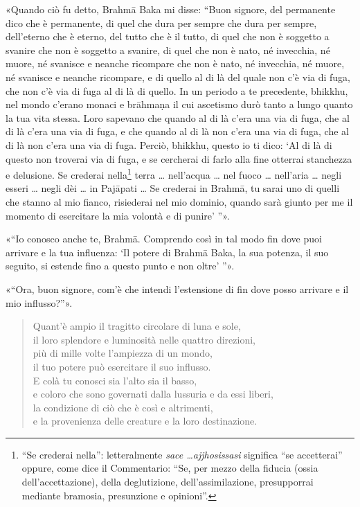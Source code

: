 «Quando ciò fu detto, Brahmā Baka mi disse: “Buon signore, del
permanente dico che è permanente, di quel che dura per sempre che dura
per sempre, dell’eterno che è eterno, del tutto che è il tutto, di quel
che non è soggetto a svanire che non è soggetto a svanire, di quel che
non è nato, né invecchia, né muore, né svanisce e neanche ricompare che
non è nato, né invecchia, né muore, né svanisce e neanche ricompare, e
di quello al di là del quale non c’è via di fuga, che non c’è via di
fuga al di là di quello. In un periodo a te precedente, bhikkhu, nel
mondo c’erano monaci e brāhmaṇa il cui ascetismo durò tanto a lungo
quanto la tua vita stessa. Loro sapevano che quando al di là c’era una
via di fuga, che al di là c’era una via di fuga, e che quando al di là
non c’era una via di fuga, che al di là non c’era una via di fuga.
Perciò, bhikkhu, questo io ti dico: ‘Al di là di questo non troverai via
di fuga, e se cercherai di farlo alla fine otterrai stanchezza e
delusione. Se crederai nella\footnote{“Se crederai nella”: letteralmente \emph{sace …​ ajjhosissasi} significa “se accetterai” oppure, come dice il Commentario: “Se, per mezzo della fiducia (ossia dell’accettazione), della deglutizione, dell’assimilazione, presupporrai mediante bramosia, presunzione e opinioni”.} terra … nell’acqua … nel
fuoco … nell’aria … negli esseri … negli dèi … in Pajāpati … Se crederai
in Brahmā, tu sarai uno di quelli che stanno al mio fianco, risiederai
nel mio dominio, quando sarà giunto per me il momento di esercitare la
mia volontà e di punire’ ”».


«“Io conosco anche te, Brahmā. Comprendo così in tal modo fin dove puoi
arrivare e la tua influenza: ‘Il potere di Brahmā Baka, la sua potenza,
il suo seguito, si estende fino a questo punto e non oltre’ ”».


«“Ora, buon signore, com’è che intendi l’estensione di fin dove posso
arrivare e il mio influsso?”».


\begin{quote}
Quant’è ampio il tragitto circolare di luna e sole, \\
il loro splendore e luminosità nelle quattro direzioni, \\
più di mille volte l’ampiezza di un mondo, \\
il tuo potere può esercitare il suo influsso. \\
E colà tu conosci sia l’alto sia il basso, \\
e coloro che sono governati dalla lussuria e da essi liberi, \\
la condizione di ciò che è così e altrimenti, \\
e la provenienza delle creature e la loro destinazione.
\end{quote}

